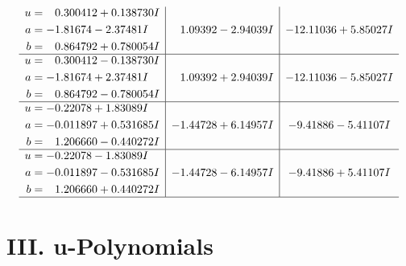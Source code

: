 \documentclass[1p]{elsarticle_modified}
\theoremstyle{definition}
\begin{document}
$$\begin{array}{c|c|c}
\begin{aligned}
u &= \phantom{-}0.300412 + 0.138730 I \\
a &= -1.81674 - 2.37481 I \\
b &= \phantom{-}0.864792 + 0.780054 I\end{aligned}
 & \phantom{-}1.09392 - 2.94039 I & -12.11036 + 5.85027 I \\ \hline\begin{aligned}
u &= \phantom{-}0.300412 - 0.138730 I \\
a &= -1.81674 + 2.37481 I \\
b &= \phantom{-}0.864792 - 0.780054 I\end{aligned}
 & \phantom{-}1.09392 + 2.94039 I & -12.11036 - 5.85027 I \\ \hline\begin{aligned}
u &= -0.22078 + 1.83089 I \\
a &= -0.011897 + 0.531685 I \\
b &= \phantom{-}1.206660 - 0.440272 I\end{aligned}
 & -1.44728 + 6.14957 I & -9.41886 - 5.41107 I \\ \hline\begin{aligned}
u &= -0.22078 - 1.83089 I \\
a &= -0.011897 - 0.531685 I \\
b &= \phantom{-}1.206660 + 0.440272 I\end{aligned}
 & -1.44728 - 6.14957 I & -9.41886 + 5.41107 I\\
 \hline 
 \end{array}$$\newpage
\newpage\renewcommand{\arraystretch}{1}
\centering \section*{ III. u-Polynomials}
\end{document}
